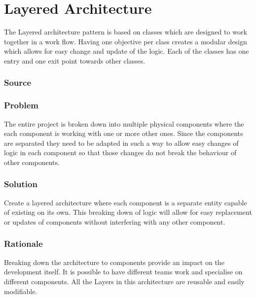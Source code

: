 

\section{Layered Architecture}
	
	The Layered architecture pattern is based on classes which are designed to work together in a work flow. Having one objective per class creates a modular design which allows for easy change and update of the logic. Each of the classes has one entry and one exit point towards other classes. 
	

	\subsubsection{Source} \cite{book:design-patterns}

	\subsubsection{Problem}

	The entire project is broken down into multiple physical components where the each component is working with one or more other ones. Since the components are separated they need to be adapted in such a way to allow easy changes of logic in each component so that those changes do not break the behaviour of other components.

	\subsubsection{Solution} 

	Create a layered architecture where each component is a separate entity capable of existing on its own. This breaking down of logic will allow for easy replacement or updates of components without interfering with any other component. 

	\subsubsection{Rationale} \label{Layers:rationale}

	Breaking down the architecture to components provide an impact on the development itself. It is possible to have different teams work and specialise on different components. All the Layers in this architecture are reusable and easily modifiable. 


